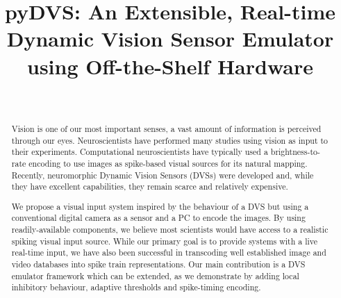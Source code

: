 \documentclass[conference]{IEEEtran}
\begin{document}
\title{pyDVS: An Extensible, Real-time Dynamic Vision Sensor Emulator using Off-the-Shelf Hardware}
\author{

\\

}


\maketitle
\begin{abstract}
Vision is one of our most important senses, a vast amount of information is perceived through our eyes. Neuroscientists have performed many studies using vision as input to their experiments. Computational neuroscientists have typically used a brightness-to-rate encoding to use images as spike-based visual sources for its natural mapping. Recently, neuromorphic Dynamic Vision Sensors (DVSs) were developed and, while they have excellent capabilities, they remain scarce and relatively expensive.

We propose a visual input system inspired by the behaviour of a DVS but using a conventional digital camera as a sensor and a PC to encode the images. By using readily-available components, we believe most scientists would have access to a realistic spiking visual input source. While our primary goal is to provide systems with a live real-time  input, we have also been successful in transcoding well established image and video databases into spike train representations. Our main contribution is a DVS emulator framework which can be extended, as we demonstrate by adding local inhibitory behaviour, adaptive thresholds and spike-timing encoding.

\end{abstract}
\IEEEpeerreviewmaketitle
\end{document}
